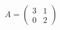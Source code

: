 \documentclass[preview]{standalone}
\begin{document}
\begin{align*}
A = \begin{pmatrix} 3 & 1 \\ 0 & 2 \end{pmatrix}
\end{align*}
\end{document}
